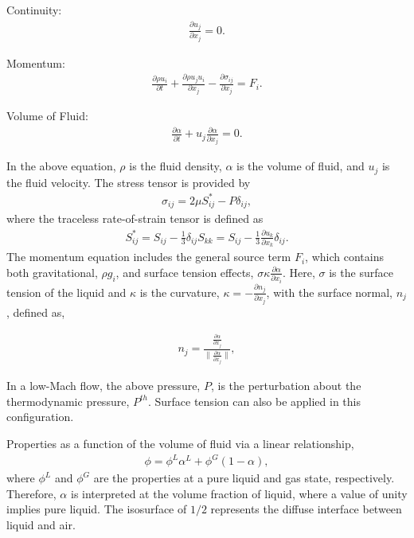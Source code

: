 \documentclass{article}
\newcommand{\norm}[1]{\| #1 \|}
\begin{document}
Continuity:
\begin{align}
  \frac{ \partial u_j}{\partial x_j} = 0.
\label{eq:contEq}
\end{align} 

Momentum:
\begin{align}
  \frac {\partial \rho u_i }{\partial t} + \frac{ \partial \rho u_j u_i}{\partial x_j} 
-\frac{\partial \sigma_{ij}}{\partial x_j} = F_i.
\label{eq:momEq}
\end{align}

Volume of Fluid:
\begin{align}
  \frac{\partial \alpha}{\partial t} + u_j \frac{ \partial \alpha }{\partial x_j} = 0.
\label{eq:contEq}
\end{align} 

%
In the above equation, $\rho$ is the fluid density, $\alpha$ is the volume of fluid, 
and $u_j$ is the fluid velocity. 
The stress tensor is provided by
\begin{align}
\sigma_{ij}  = 2 \mu S^*_{ij} - P \delta_{ij},
\end{align}
%
where the traceless rate-of-strain tensor is defined as
\begin{align}
S^*_{ij}  = S_{ij} - \frac{1}{3} \delta_{ij} S_{kk} \nonumber
		     = S_{ij} - \frac{1}{3} \frac{\partial  u_k }{\partial x_k}\delta_{ij}.
\end{align}
The momentum equation includes the general source term $F_i$, which contains
both gravitational, $\rho g_i$, and surface tension 
effects, $\sigma \kappa \frac{\partial \alpha}{\partial x_i}$. Here, 
$\sigma$ is the surface tension of the liquid and $\kappa$ is the 
curvature, $\kappa = -\frac{\partial n_j}{\partial x_j}$, with the 
surface normal, $n_j$, defined as,

\begin{align}
  n_j = \frac{\frac{\partial \alpha}{ \partial x_j}} {\norm{\frac{\partial \alpha}{ \partial x_j}}},
\label{vofNorm}
\end{align}

In a low-Mach flow, the above pressure, $P$, is the perturbation about the thermodynamic
pressure, $P^{th}$. Surface tension can also be applied in this configuration.

Properties as a function of the volume of fluid via a linear relationship,
\begin{align}
\phi = \phi^L \alpha^L + \phi^G\left(1-\alpha \right),
\end{align}
where $\phi^L$ and $\phi^G$ are the properties at a pure liquid and gas state, respectively. Therefore,
$\alpha$ is interpreted at the volume fraction of liquid, where a value of unity implies pure liquid.
The isosurface of $1/2$ represents the diffuse interface between liquid and air.
\end{document}
